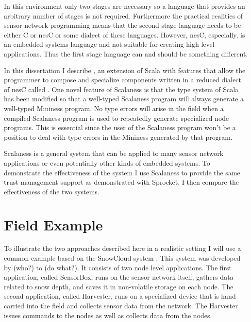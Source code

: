 
In this environment only two stages are necessary so a language that provides an arbitrary
number of stages is not required. Furthermore the practical realities of sensor network
programming means that the second stage language needs to be either C or nesC or some dialect of
these languages. However, nesC, especially, is an embedded systems language and not suitable for
creating high level applications. Thus the first stage language can and should be something
different.

In this dissertation I describe , an extension of Scala \cite{PiS2} with
features that allow the programmer to compose and specialize components written in a reduced
dialect of nesC called . One novel feature of Scalaness is that the type
system of Scala has been modified so that a well-typed Scalaness program will always generate a
well-typed Mininess program. No type errors will arise in the field when a compiled Scalaness
program is used to repeatedly generate specialized node programs. This is essential since the
user of the Scalaness program won't be a position to deal with type errors in the Mininess
generated by that program.

Scalaness is a general system that can be applied to many sensor network applications or even
potentially other kinds of embedded systems. To demonstrate the effectiveness of the system I
use Scalaness to provide the same trust management support as demonstrated with Sprocket. I then
compare the effectiveness of the two systems.

\section{Field Example}

To illustrate the two approaches described here in a realistic setting I will use a common
example based on the SnowCloud system \cite{XXX}. This system was developed by (who?) to (do
what?).  It consists of two node level applications. The first application, called
SensorBox, runs on the sensor network itself, gathers data related to snow depth, and saves it
in non-volatile storage on each node. The second application, called Harvester, runs on a
specialized device that is hand carried into the field and collects sensor data from the
network. The Harvester issues commands to the nodes as well as collects data from the nodes.

